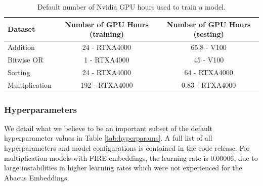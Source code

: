 \documentclass{article}
\begin{document}
\begin{table}
    \centering
    \caption{Default number of Nvidia GPU hours used to train a model.}
    \renewcommand{\arraystretch}{1.5}
    \begin{tabular}{lcc}
    \toprule
        Dataset & Number of GPU Hours (training)&Number of GPU Hours (testing)\\  
        \midrule
       Addition  & 24 - RTXA4000&65.8 - V100\\
       Bitwise OR  & 1 - RTXA4000&45 - V100\\
        Sorting & 24 - RTXA4000&64 - RTXA4000\\
         Multiplication & 192 - RTXA4000&0.83 - RTXA4000\\
         \bottomrule
    \end{tabular}
    \label{tab:GPU-use}
\end{table}

\subsubsection{Hyperparameters}
We detail what we believe to be an important subset of the default hyperparameter values in Table \ref{tab:hyperparams}.
A full list of all hyperparameters and model configurations is contained in the code release.
For multiplication models with FIRE embeddings, the learning rate is \(0.00006\), due to large instabilities in higher learning rates which were not experienced for the Abacus Embeddings.
\end{document}
